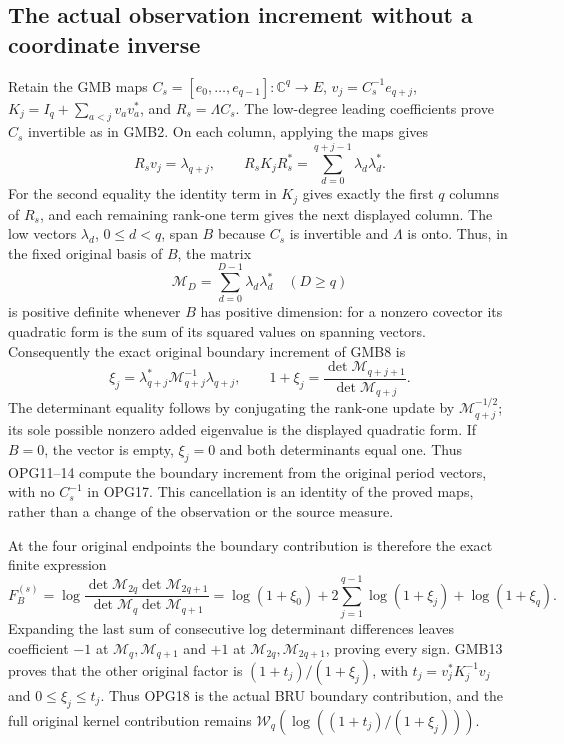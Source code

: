 \subsection{The actual observation increment without a coordinate inverse}
Retain the GMB maps
$C_s=[e_0,\ldots,e_{q-1}]:\mathbb C^q\to E$,
$v_j=C_s^{-1}e_{q+j}$,
$K_j=I_q+\sum_{a<j}v_av_a^*$, and $R_s=\Lambda C_s$.
The low-degree leading coefficients prove $C_s$ invertible as in
GMB2. On each column, applying the maps gives
\[
 R_s v_j=\lambda_{q+j},\qquad
 R_sK_jR_s^*=\sum_{d=0}^{q+j-1}\lambda_d\lambda_d^*.
 \tag{OPG15}
\]
For the second equality the identity term in $K_j$ gives exactly
the first $q$ columns of $R_s$, and each remaining rank-one term
gives the next displayed column. The low vectors $\lambda_d$,
$0\leq d<q$, span $B$ because $C_s$ is invertible and $\Lambda$
is onto. Thus, in the fixed original basis of $B$, the matrix
\[
 \mathcal M_D=\sum_{d=0}^{D-1}\lambda_d\lambda_d^*\quad(D\geq q)
 \tag{OPG16}
\]
is positive definite whenever $B$ has positive dimension:
for a nonzero covector its quadratic form is the sum of its
squared values on spanning vectors. Consequently the exact
original boundary increment of GMB8 is
\[
 \boxed{\displaystyle
 \xi_j=\lambda_{q+j}^*\mathcal M_{q+j}^{-1}\lambda_{q+j},\qquad
 1+\xi_j=\frac{\det\mathcal M_{q+j+1}}{\det\mathcal M_{q+j}}.}
 \tag{OPG17}
\]
The determinant equality follows by conjugating the rank-one
update by $\mathcal M_{q+j}^{-1/2}$; its sole possible nonzero
added eigenvalue is the displayed quadratic form. If $B=0$,
the vector is empty, $\xi_j=0$ and both determinants equal one.
Thus OPG11--14 compute the boundary increment from the original
period vectors, with no $C_s^{-1}$ in OPG17. This cancellation
is an identity of the proved maps, rather than a change of the
observation or the source measure.

At the four original endpoints the boundary contribution is
therefore the exact finite expression
\[
 F_B^{(s)}=
 \log\frac{\det\mathcal M_{2q}\det\mathcal M_{2q+1}}
                 {\det\mathcal M_q\det\mathcal M_{q+1}}
 =\log(1+\xi_0)+2\sum_{j=1}^{q-1}\log(1+\xi_j)
                         +\log(1+\xi_q).
 \tag{OPG18}
\]
Expanding the last sum of consecutive log determinant differences
leaves coefficient $-1$ at $\mathcal M_q,\mathcal M_{q+1}$ and
$+1$ at $\mathcal M_{2q},\mathcal M_{2q+1}$, proving every sign.
GMB13 proves that the other original factor is
$(1+t_j)/(1+\xi_j)$, with $t_j=v_j^*K_j^{-1}v_j$ and
$0\leq\xi_j\leq t_j$. Thus OPG18 is the actual BRU boundary
contribution, and the full original kernel contribution remains
$\mathcal W_q(\log((1+t_j)/(1+\xi_j)))$.

